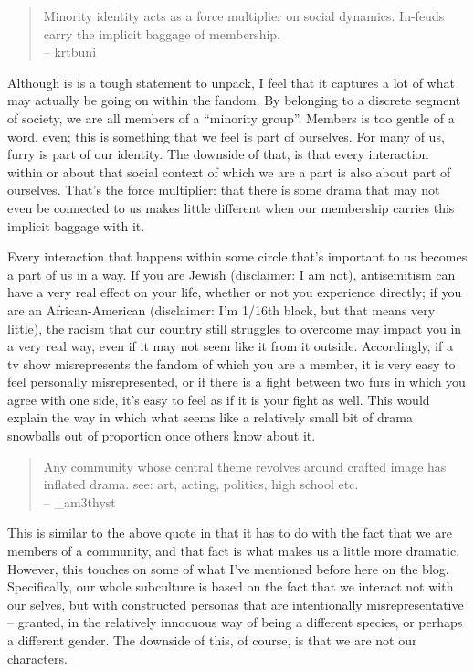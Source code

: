 \begin{quote}
  Minority identity acts as a force multiplier on social dynamics. In-feuds carry the implicit baggage of membership.\\
  -- krtbuni
\end{quote}

Although is is a tough statement to unpack, I feel that it captures a lot of what may actually be going on within the fandom. By belonging to a discrete segment of society, we are all members of a “minority group”. Members is too gentle of a word, even; this is something that we feel is part of ourselves. For many of us, furry is part of our identity. The downside of that, is that every interaction within or about that social context of which we are a part is also about part of ourselves. That's the force multiplier: that there is some drama that may not even be connected to us makes little different when our membership carries this implicit baggage with it.

Every interaction that happens within some circle that's important to us becomes a part of us in a way. If you are Jewish (disclaimer: I am not), antisemitism can have a very real effect on your life, whether or not you experience directly; if you are an African-American (disclaimer: I'm 1/16th black, but that means very little), the racism that our country still struggles to overcome may impact you in a very real way, even if it may not seem like it from it outside. Accordingly, if a tv show misrepresents the fandom of which you are a member, it is very easy to feel personally misrepresented, or if there is a fight between two furs in which you agree with one side, it's easy to feel as if it is your fight as well. This would explain the way in which what seems like a relatively small bit of drama snowballs out of proportion once others know about it.

\begin{quote}
  Any community whose central theme revolves around crafted image has inflated drama. see: art, acting, politics, high school etc.\\
  -- \_am3thyst
\end{quote}

This is similar to the above quote in that it has to do with the fact that we are members of a community, and that fact is what makes us a little more dramatic. However, this touches on some of what I've mentioned before here on the blog. Specifically, our whole subculture is based on the fact that we interact not with our selves, but with constructed personas that are intentionally misrepresentative -- granted, in the relatively innocuous way of being a different species, or perhaps a different gender. The downside of this, of course, is that we are not our characters.

